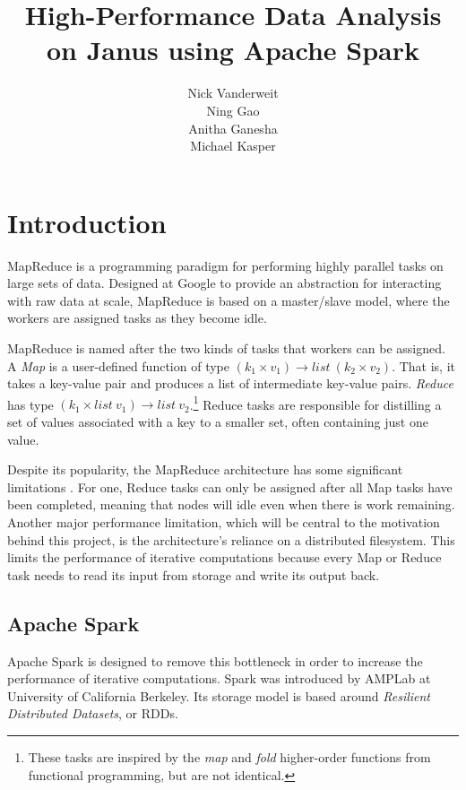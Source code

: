\documentclass{article}
\title{High-Performance Data Analysis on Janus using Apache Spark}
\author{Nick Vanderweit \\
        Ning Gao \\
        Anitha Ganesha \\
        Michael Kasper}
\begin{document}
\maketitle

\begin{abstract}
\end{abstract}

\section*{Introduction}
MapReduce \citep{dean-mapreduce} is a programming paradigm for performing highly
parallel tasks on large sets of data. Designed at Google to provide an
abstraction for interacting with raw data at scale, MapReduce is based on
a master/slave model, where the workers are assigned tasks as they become idle.

MapReduce is named after the two kinds of tasks that workers can be assigned.
A \emph{Map} is a user-defined function of type
$(k_1 \times v_1) \rightarrow list \: (k_2 \times v_2)$.
That is, it takes a key-value pair and produces a list of
intermediate key-value pairs. \emph{Reduce} has type
$(k_1 \times list \: v_1) \rightarrow list \: v_2$.\footnote{
These tasks are inspired by the \emph{map} and \emph{fold}
higher-order functions from functional programming, but are not identical.}
Reduce tasks are responsible for distilling a set of values associated with
a key to a smaller set, often containing just one value.

Despite its popularity, the MapReduce architecture has some significant
limitations \citep{lee-survey}. For one, Reduce tasks can only be assigned after
all Map tasks have been completed, meaning that nodes will idle even when there
is work remaining. Another major performance limitation, which will be central
to the motivation behind this project, is the architecture's reliance on a
distributed filesystem. This limits the performance of iterative computations
because every Map or Reduce task needs to read its input from storage and write
its output back.

\subsection*{Apache Spark}
Apache Spark \citep{zaharia} is designed to remove this bottleneck in order to
increase the performance of iterative computations. Spark was introduced by
AMPLab at University of California Berkeley. Its storage model is
based around \emph{Resilient Distributed Datasets}, or
RDDs. \citep{zaharia_rdd}
\end{document}
